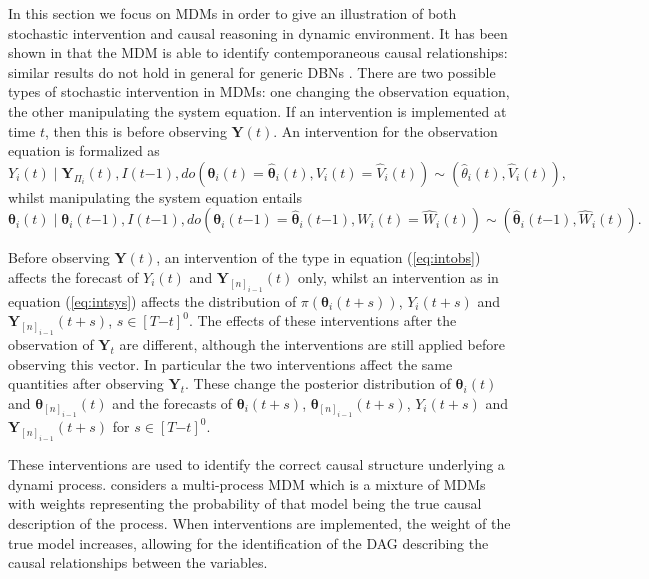 In this section we focus on \glspl{MDM} in order to give an illustration of  both stochastic intervention and causal reasoning in dynamic environment. It has been shown in \citet{Queen2009} that the \gls{MDM} is able to identify contemporaneous causal relationships: similar results do not hold in general for generic \glspl{DBN} \citep{Eichler2007}.  There are two possible types of stochastic intervention in \glspl{MDM}: one changing the observation equation, the other manipulating the system equation. If an intervention is implemented at time $t$, then this is before observing $\bm{Y}(t)$. An intervention for the observation equation is formalized as
\begin{equation}
\label{eq:intobs}
Y_i(t)\;|\;\bm{Y}_{\Pi_i}(t),I(t{-1}),do\left(\bm{\theta}_i(t)=\hat{\bm{\theta}}_i(t), V_i(t)=\hat{V}_i(t)\right)\sim (\hat{\theta}_i(t),\hat{V}_i(t)),
\end{equation}  
whilst manipulating the system equation entails
\begin{equation}
\label{eq:intsys}
\bm{\theta}_i(t)\;|\;\bm{\theta}_i(t{-1}),I(t{-1}),do\left(\bm{\theta}_{i}(t{-1})=\hat{\bm{\theta}}_i(t{-1}),W_i(t)=\hat{W}_i(t)\right)\sim (\hat{\bm{\theta}}_i(t{-1}),\hat{W}_i(t)).
\end{equation}

Before observing $\bm{Y}(t)$, an intervention of the type in equation (\ref{eq:intobs}) affects the forecast of $Y_i(t)$ and $\bm{Y}_{[n]_{i-1}}(t)$ only, whilst an intervention as in equation (\ref{eq:intsys}) affects the distribution of  $\pi(\bm{\theta}_i(t+s))$, $Y_i(t+s)$ and  $\bm{Y}_{[n]_{i-1}}(t+s)$, $s\in[T{-t}]^0$. The effects of these interventions after the observation of $\bm{Y}_t$ are different, although the interventions are still applied before observing this vector. In particular the two interventions affect the same quantities after observing $\bm{Y}_t$. These change the posterior distribution of $\bm{\theta}_i(t)$ and $\bm{\theta}_{[n]_{i-1}}(t)$ and the forecasts of $\bm{\theta}_i(t+s)$, $\bm{\theta}_{[n]_{i-1}}(t+s)$, $Y_i(t+s)$ and $\bm{Y}_{[n]_{i-1}}(t+s)$ for $s\in[T{-t}]^0$. 

These interventions are used to identify the correct causal structure underlying a dynami process. \citet{Queen2009} considers a multi-process \gls{MDM} which is a mixture of \glspl{MDM} with weights representing the probability of that model being the true causal description of the process. When interventions are implemented, the weight of the true model increases, allowing for the identification of the \gls{DAG} describing the causal relationships between the variables.
 
